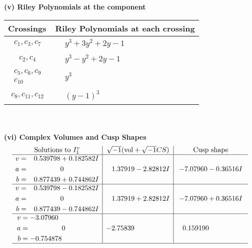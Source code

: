 \documentclass[1p]{elsarticle_modified}
\theoremstyle{definition}
\newcommand{\I}{\sqrt{-1}}
\begin{document}
\newpage\renewcommand{\arraystretch}{1}
\flushleft \textbf{(v) Riley Polynomials at the component}\newline \\
\begin{tabular}{m{50pt}|m{274pt}}
Crossings & \hspace{64pt}Riley Polynomials at each crossing \\
\hline $$\begin{aligned}c_{1},c_{3},c_{7}\end{aligned}$$&$\begin{aligned}
&y^3+3 y^2+2 y-1
\end{aligned}$\\
\hline $$\begin{aligned}c_{2},c_{4}\end{aligned}$$&$\begin{aligned}
&y^3- y^2+2 y-1
\end{aligned}$\\
\hline $$\begin{aligned}c_{5},c_{6},c_{9}\\c_{10}\end{aligned}$$&$\begin{aligned}
&y^3
\end{aligned}$\\
\hline $$\begin{aligned}c_{8},c_{11},c_{12}\end{aligned}$$&$\begin{aligned}
&(y-1)^3
\end{aligned}$\\
\hline
\end{tabular}\\~\\
\newpage\flushleft \textbf{(vi) Complex Volumes and Cusp Shapes}
$$\begin{array}{c|c|c}  
\text{Solutions to }I^v_{1}& \I (\text{vol} + \sqrt{-1}CS) & \text{Cusp shape}\\
 \hline 
\begin{aligned}
v &= \phantom{-}0.539798 + 0.182582 I \\
a &= \phantom{-0.000000 } 0 \\
b &= \phantom{-}0.877439 + 0.744862 I\end{aligned}
 & \phantom{-}1.37919 - 2.82812 I & -7.07960 - 0.36516 I \\ \hline\begin{aligned}
v &= \phantom{-}0.539798 - 0.182582 I \\
a &= \phantom{-0.000000 } 0 \\
b &= \phantom{-}0.877439 - 0.744862 I\end{aligned}
 & \phantom{-}1.37919 + 2.82812 I & -7.07960 + 0.36516 I \\ \hline\begin{aligned}
v &= -3.07960\phantom{ +0.000000I} \\
a &= \phantom{-0.000000 } 0 \\
b &= -0.754878\phantom{ +0.000000I}\end{aligned}
 & -2.75839\phantom{ +0.000000I} & \phantom{-}0.159190\phantom{ +0.000000I}\\
 \hline 
 \end{array}$$\newpage
\end{document}
